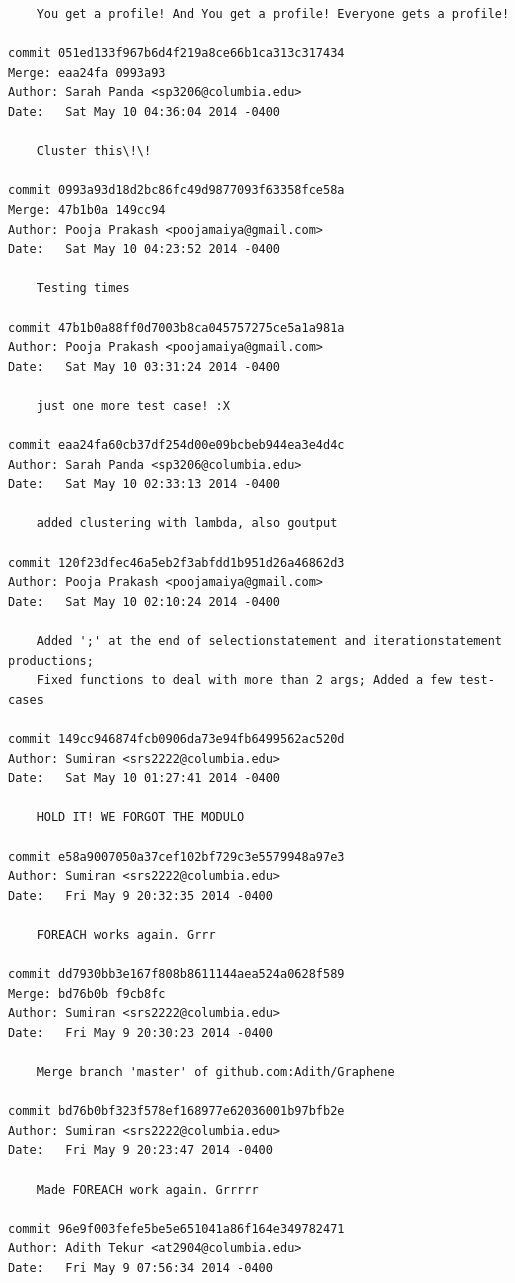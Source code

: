 \documentclass[a4paper]{article}
\begin{document}
\begin{verbatim}
    You get a profile! And You get a profile! Everyone gets a profile!

commit 051ed133f967b6d4f219a8ce66b1ca313c317434
Merge: eaa24fa 0993a93
Author: Sarah Panda <sp3206@columbia.edu>
Date:   Sat May 10 04:36:04 2014 -0400

    Cluster this\!\!

commit 0993a93d18d2bc86fc49d9877093f63358fce58a
Merge: 47b1b0a 149cc94
Author: Pooja Prakash <poojamaiya@gmail.com>
Date:   Sat May 10 04:23:52 2014 -0400

    Testing times

commit 47b1b0a88ff0d7003b8ca045757275ce5a1a981a
Author: Pooja Prakash <poojamaiya@gmail.com>
Date:   Sat May 10 03:31:24 2014 -0400

    just one more test case! :X

commit eaa24fa60cb37df254d00e09bcbeb944ea3e4d4c
Author: Sarah Panda <sp3206@columbia.edu>
Date:   Sat May 10 02:33:13 2014 -0400

    added clustering with lambda, also goutput

commit 120f23dfec46a5eb2f3abfdd1b951d26a46862d3
Author: Pooja Prakash <poojamaiya@gmail.com>
Date:   Sat May 10 02:10:24 2014 -0400

    Added ';' at the end of selectionstatement and iterationstatement productions; 
    Fixed functions to deal with more than 2 args; Added a few test-cases

commit 149cc946874fcb0906da73e94fb6499562ac520d
Author: Sumiran <srs2222@columbia.edu>
Date:   Sat May 10 01:27:41 2014 -0400

    HOLD IT! WE FORGOT THE MODULO

commit e58a9007050a37cef102bf729c3e5579948a97e3
Author: Sumiran <srs2222@columbia.edu>
Date:   Fri May 9 20:32:35 2014 -0400

    FOREACH works again. Grrr

commit dd7930bb3e167f808b8611144aea524a0628f589
Merge: bd76b0b f9cb8fc
Author: Sumiran <srs2222@columbia.edu>
Date:   Fri May 9 20:30:23 2014 -0400

    Merge branch 'master' of github.com:Adith/Graphene

commit bd76b0bf323f578ef168977e62036001b97bfb2e
Author: Sumiran <srs2222@columbia.edu>
Date:   Fri May 9 20:23:47 2014 -0400

    Made FOREACH work again. Grrrrr

commit 96e9f003fefe5be5e651041a86f164e349782471
Author: Adith Tekur <at2904@columbia.edu>
Date:   Fri May 9 07:56:34 2014 -0400


\end{verbatim}
\end{document}
